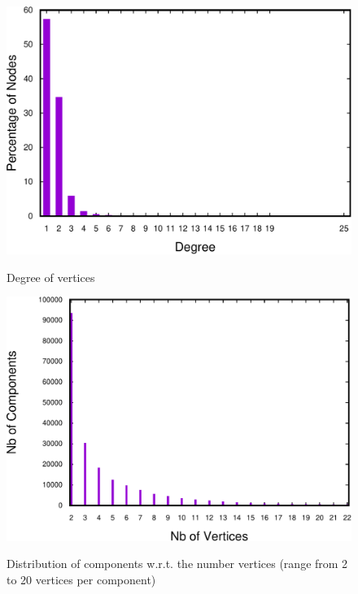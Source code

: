 \begin{figure}[!tbp]
  \centering
     {\includegraphics[scale=0.3]{bench/degree-counter-crop.pdf}}
  \label{fig:degree-vertices}
  \caption{Degree of vertices}
\end{figure}

\begin{figure}
\centering
\includegraphics[scale=0.35]{bench/frequency20-crop.pdf}
\label{fig:vertices-components-20}
\caption{Distribution of components w.r.t. the number vertices (range from 2 to 20 vertices per component)}
\end{figure}

